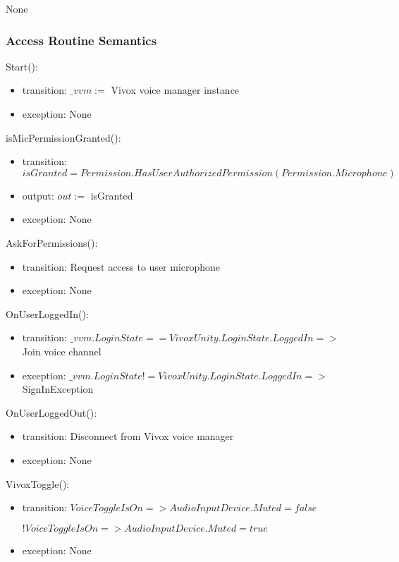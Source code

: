 \documentclass[12pt, titlepage]{article}
\begin{document}
None\\

\subsubsection{Access Routine Semantics}


\noindent Start():
\begin{itemize}
\item transition: $\_vvm :=$ Vivox voice manager instance
\item exception: None
\end{itemize}

\noindent isMicPermissionGranted():
\begin{itemize}
\item transition: $isGranted = Permission.HasUserAuthorizedPermission(Permission.Microphone)$
\item output: $out :=$ isGranted
\item exception: None
\end{itemize}

\noindent AskForPermissions():
\begin{itemize}
\item transition: Request access to user microphone
\item exception: None
\end{itemize}

\noindent OnUserLoggedIn():
\begin{itemize}
\item transition: $\_vvm.LoginState == VivoxUnity.LoginState.LoggedIn =>$ Join voice channel
\item exception: $\_vvm.LoginState != VivoxUnity.LoginState.LoggedIn =>$ SignInException
\end{itemize}

\noindent OnUserLoggedOut():
\begin{itemize}
\item transition: Disconnect from Vivox voice manager
\item exception: None
\end{itemize}

\noindent VivoxToggle():
\begin{itemize}
\item transition: $VoiceToggleIsOn => AudioInputDevice.Muted = false$

$!VoiceToggleIsOn => AudioInputDevice.Muted = true$
\item exception: None
\end{itemize}
\end{document}
